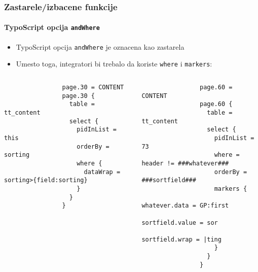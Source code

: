 \begin{frame}[fragile]
	\frametitle{Zastarele/izbacene funkcije}
	\framesubtitle{TypoScript opcija \texttt{andWhere}}

	\lstset{basicstyle=\tiny\ttfamily}

	\begin{itemize}
		\item TypoScript opcija \texttt{andWhere} je oznacena kao zastarela
		\item Umesto toga, integratori bi trebalo da koriste \texttt{where} i \texttt{markers}:
	\end{itemize}

	\begin{columns}[T]
		\begin{column}{.6\textwidth}

			\lstset{xleftmargin=1cm}

			\begin{lstlisting}
				page.30 = CONTENT
				page.30 {
				  table = tt_content
				  select {
				    pidInList = this
				    orderBy = sorting
				    where {
				      dataWrap = sorting>{field:sorting}
				    }
				  }
				}
			\end{lstlisting}
		\end{column}
		\begin{column}{.4\textwidth}
			\begin{lstlisting}
				page.60 = CONTENT
				page.60 {
				  table = tt_content
				  select {
				    pidInList = 73
				    where = header != ###whatever###
				    orderBy = ###sortfield###
				    markers {
				      whatever.data = GP:first
				      sortfield.value = sor
				      sortfield.wrap = |ting
				    }
				  }
				}
			\end{lstlisting}
		\end{column}
	\end{columns}

\end{frame}


